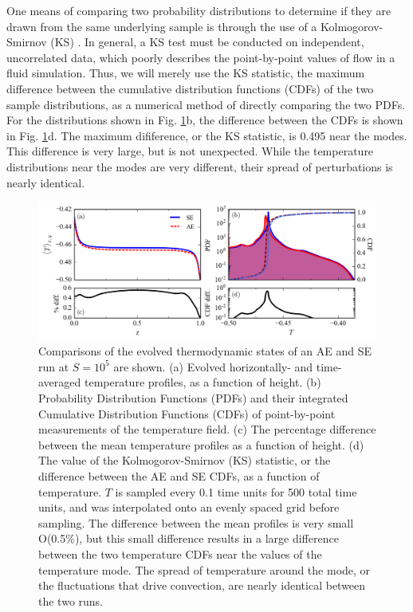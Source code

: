 \documentclass[aps, pre, onecolumn, nofootinbib, notitlepage, groupedaddress, amsfonts, amssymb, amsmath, longbibliography]{revtex4-1}
\begin{document}
One means of comparing two
probability distributions to determine if they are drawn from the same underlying
sample is through the use of a Kolmogorov-Smirnov (KS) \cite{wall&jenkins2012}.
In general, a KS test must be conducted on independent, uncorrelated data, which
poorly describes the point-by-point values of flow in a fluid simulation. Thus,
we will merely use the KS statistic, the maximum difference
between the cumulative distribution functions (CDFs) of the two sample distributions,
as a numerical method of directly comparing the two PDFs.  For the distributions
shown in Fig. \ref{fig:temp_comparison}b, the difference between the CDFs is shown
in Fig. \ref{fig:temp_comparison}d.  The maximum difiference, or the KS statistic,
is 0.495 near the modes.  This difference is very large, but is not unexpected.
While the temperature distributions near the modes are very different, their spread
of perturbations is nearly identical.


\begin{figure}[t]
\includegraphics[width=\textwidth]{./figs/temp_comparison.png}
\caption{Comparisons of the evolved thermodynamic states of an AE and SE run
at $S = 10^{5}$ are shown.  (a) Evolved horizontally- and time-averaged 
temperature profiles, as a function of height.
(b) Probability Distribution Functions (PDFs) and their integrated
Cumulative Distribution Functions (CDFs)
of point-by-point measurements of the temperature field.
(c) The percentage difference between the mean temperature profiles as a function of height.
(d) The value of the Kolmogorov-Smirnov (KS) statistic, or the difference between
the AE and SE CDFs, as a function of temperature.
$T$ is sampled every 0.1 time units for 500 total time units,
and was interpolated onto an evenly spaced grid before sampling.
The difference between the mean profiles is very small O(0.5\%), but this small
difference results in a large difference between the two temperature CDFs near the values
of the temperature mode.  The spread of temperature around the mode, or the fluctuations that
drive convection, are nearly identical between the two runs.
\label{fig:temp_comparison} }
\end{figure}
\end{document}

